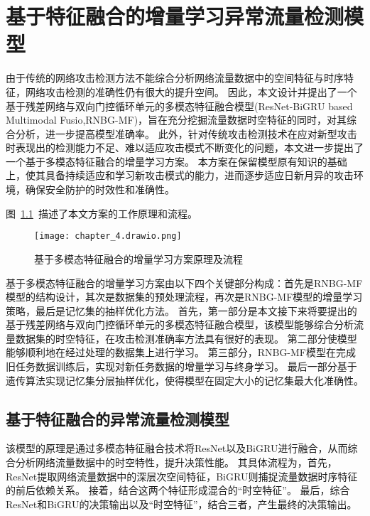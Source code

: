\chapter{基于特征融合的增量学习异常流量检测模型}
\label{cha:ResNet-BiGRU}

由于传统的网络攻击检测方法不能综合分析网络流量数据中的空间特征与时序特征，网络攻击检测的准确性仍有很大的提升空间。
因此，本文设计并提出了一个基于残差网络与双向门控循环单元的多模态特征融合模型(ResNet-BiGRU based Multimodal Fusio,RNBG-MF)，旨在充分挖掘流量数据时空特征的同时，对其综合分析，进一步提高模型准确率。
此外，针对传统攻击检测技术在应对新型攻击时表现出的检测能力不足、难以适应攻击模式不断变化的问题，本文进一步提出了一个基于多模态特征融合的增量学习方案。
本方案在保留模型原有知识的基础上，使其具备持续适应和学习新攻击模式的能力，进而逐步适应日新月异的攻击环境，确保安全防护的时效性和准确性。

图~\ref{fig:attack_detecion_model}~描述了本文方案的工作原理和流程。
\begin{figure}[h]
	\centering
	\texttt{[image: chapter\_4.drawio.png]}
	\caption{基于多模态特征融合的增量学习方案原理及流程}
	\label{fig:attack_detecion_model}
\end{figure}
基于多模态特征融合的增量学习方案由以下四个关键部分构成：首先是RNBG-MF模型的结构设计，其次是数据集的预处理流程，再次是RNBG-MF模型的增量学习策略，最后是记忆集的抽样优化方法。
首先，第一部分是本文接下来将要提出的基于残差网络与双向门控循环单元的多模态特征融合模型，该模型能够综合分析流量数据集的时空特征，在攻击检测准确率方法具有很好的表现。
第二部分使模型能够顺利地在经过处理的数据集上进行学习。
第三部分，RNBG-MF模型在完成旧任务数据训练后，实现对新任务数据的增量学习与终身学习。
最后一部分基于遗传算法实现记忆集分层抽样优化，使得模型在固定大小的记忆集最大化准确性。

\section{基于特征融合的异常流量检测模型}
该模型的原理是通过多模态特征融合技术将ResNet以及BiGRU进行融合，从而综合分析网络流量数据中的时空特性，提升决策性能。
其具体流程为，首先，ResNet提取网络流量数据中的深层次空间特征，BiGRU则捕捉流量数据时序特征的前后依赖关系。
接着，结合这两个特征形成混合的“时空特征”。
最后，综合ResNet和BiGRU的决策输出以及“时空特征”，结合三者，产生最终的决策输出。
